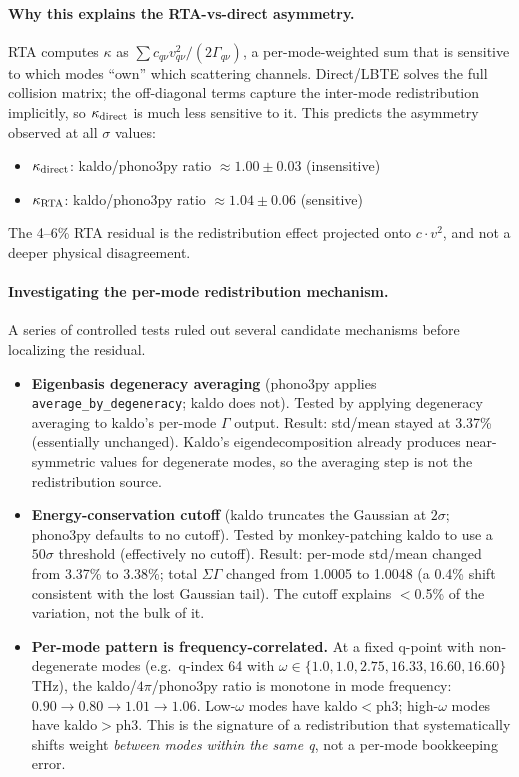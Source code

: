\documentclass[11pt,a4paper]{article}
\begin{document}
\paragraph{Why this explains the RTA-vs-direct asymmetry.} RTA computes $\kappa$ as
$\sum c_{q\nu} v_{q\nu}^2 / (2\Gamma_{q\nu})$, a per-mode-weighted sum that is sensitive to
which modes ``own'' which scattering channels. Direct/LBTE solves the full collision matrix; the
off-diagonal terms capture the inter-mode redistribution implicitly, so $\kappa_{\rm direct}$ is
much less sensitive to it. This predicts the asymmetry observed at all $\sigma$ values:
\begin{itemize}[leftmargin=2em, itemsep=2pt]
  \item $\kappa_{\rm direct}$: kaldo/phono3py ratio $\approx 1.00 \pm 0.03$ (insensitive)
  \item $\kappa_{\rm RTA}$: kaldo/phono3py ratio $\approx 1.04 \pm 0.06$ (sensitive)
\end{itemize}

The 4--6\% RTA residual is the redistribution effect projected onto $c \cdot v^2$, and not a
deeper physical disagreement.

\paragraph{Investigating the per-mode redistribution mechanism.} A series of controlled tests
ruled out several candidate mechanisms before localizing the residual.

\begin{itemize}[leftmargin=2em, itemsep=0.4em]
  \item \textbf{Eigenbasis degeneracy averaging} (phono3py applies
        \texttt{average\_by\_degeneracy}; kaldo does not). Tested by applying degeneracy
        averaging to kaldo's per-mode $\Gamma$ output. Result: std/mean stayed at 3.37\%
        (essentially unchanged). Kaldo's eigendecomposition already produces near-symmetric
        values for degenerate modes, so the averaging step is not the redistribution source.
  \item \textbf{Energy-conservation cutoff} (kaldo truncates the Gaussian at $2\sigma$;
        phono3py defaults to no cutoff). Tested by monkey-patching kaldo to use a $50\sigma$
        threshold (effectively no cutoff). Result: per-mode std/mean changed from 3.37\% to
        3.38\%; total $\Sigma\Gamma$ changed from 1.0005 to 1.0048 (a 0.4\% shift consistent
        with the lost Gaussian tail). The cutoff explains $<$0.5\% of the variation, not the
        bulk of it.
  \item \textbf{Per-mode pattern is frequency-correlated.} At a fixed q-point with non-degenerate
        modes (e.g.\ q-index 64 with $\omega\in\{1.0, 1.0, 2.75, 16.33, 16.60, 16.60\}$ THz),
        the kaldo/$4\pi$/phono3py ratio is monotone in mode frequency: $0.90 \to 0.80 \to 1.01
        \to 1.06$. Low-$\omega$ modes have kaldo$<$ph3; high-$\omega$ modes have kaldo$>$ph3.
        This is the signature of a redistribution that systematically shifts weight \emph{between
        modes within the same q}, not a per-mode bookkeeping error.
\end{itemize}
\end{document}
